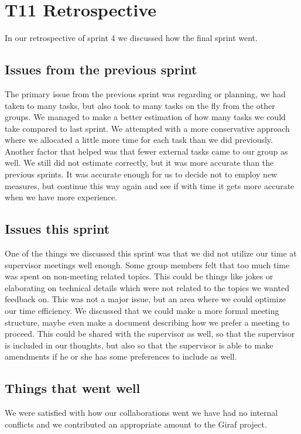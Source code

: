 \section{\gls{T11} Retrospective}

In our retrospective of sprint 4 we discussed how the final sprint went.

\subsection{Issues from the previous sprint}
The primary issue from the previous sprint was regarding or planning, we had taken to many tasks, but also took to many tasks on the fly from the other groups.
We managed to make a better estimation of how many tasks we could take compared to last sprint. We attempted with a more conservative approach where we allocated a little more time for each task than we did previously. Another factor that helped was that fewer external tasks came to our group as well. We still did not estimate correctly, but it was more accurate than the previous  sprints. It was accurate enough for us to decide not to employ new measures, but continue this way again and see if with time it gets more accurate when we have more experience.

\subsection{Issues this sprint}
One of the things we discussed this sprint was that we did not utilize our time at supervisor meetings well enough. Some group members felt that too much time was spent on non-meeting related topics. This could be things like jokes or elaborating on technical details which were not related to the topics we wanted feedback on. This was not a major issue, but an area where we could optimize our time efficiency.
We discussed that we could make a more formal meeting structure, maybe even make a document describing how we prefer a meeting to proceed. This could be shared with the supervisor as well, so that the supervisor is included in our thoughts, but also so that the supervisor is able to make amendments if he or she has some preferences to include as well.

\subsection{Things that went well}
We were satisfied with how our collaborations went we have had no internal conflicts and we contributed an appropriate amount to the Giraf project. 
